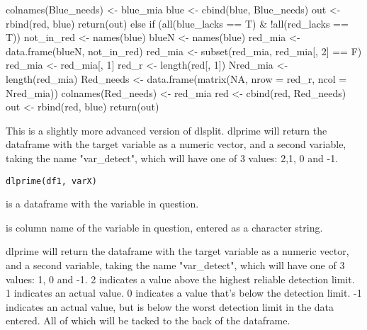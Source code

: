 \documentclass[letterpaper]{book}
\begin{document}
\begin{Examples}
\begin{ExampleCode}
{{        colnames(Blue_needs) <- blue_mia
        blue <- cbind(blue, Blue_needs)
        out <- rbind(red, blue)
        return(out)
    }
    else if (all(blue_lacks == T) & !all(red_lacks == T)) {
        not_in_red <- names(blue) %
        blueN <- names(blue)
        red_mia <- data.frame(blueN, not_in_red)
        red_mia <- subset(red_mia, red_mia[, 2] == F)
        red_mia <- red_mia[, 1]
        red_r <- length(red[, 1])
        Nred_mia <- length(red_mia)
        Red_needs <- data.frame(matrix(NA, nrow = red_r, ncol = Nred_mia))
        colnames(Red_needs) <- red_mia
        red <- cbind(red, Red_needs)
        out <- rbind(red, blue)
        return(out)
    }
  }
\end{ExampleCode}
\end{Examples}
%
\begin{Description}\relax

This is a slightly more advanced version of dlsplit. 
dlprime will return the dataframe with the target variable as a numeric vector, and a second variable, taking the name "var\_detect", which will have one of 3 values: 2,1, 0 and -1. 
\end{Description}
%
\begin{Usage}
\begin{verbatim}
dlprime(df1, varX)
\end{verbatim}
\end{Usage}
%
\begin{Arguments}
\begin{ldescription}
\item[\code{df1}] 

is a dataframe with the variable in question. 

\item[\code{varX}] 

is column name of the variable in question, entered as a character string. 

\end{ldescription}
\end{Arguments}
%
\begin{Value}




dlprime will return the dataframe with the target variable as a numeric vector, and a second variable, taking the name "var\_detect", which will have one of 3 values: 1, 0 and -1. 
2 indicates a value above the highest reliable detection limit. 
1 indicates an actual value.
0 indicates a value that's below the detection limit.
-1 indicates an actual value, but is below the worst detection limit in the data entered. 
All of which will be tacked to the back of the dataframe. 
\end{Value}
\end{document}

